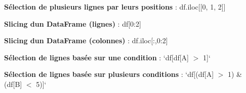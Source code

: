 {\bfseries Sélection de plusieurs lignes par leurs positions} \+: {\ttfamily df.\+iloc\mbox{[}\mbox{[}0, 1, 2\mbox{]}\mbox{]}}

{\bfseries Slicing d\textquotesingle{}un Data\+Frame (lignes)} \+: {\ttfamily df\mbox{[}0\+:2\mbox{]}}

{\bfseries Slicing d\textquotesingle{}un Data\+Frame (colonnes)} \+: {\ttfamily df.\+iloc\mbox{[}\+:,0\+:2\mbox{]}}

{\bfseries Sélection de lignes basée sur une condition} \+: `df\mbox{[}df\mbox{[}\textquotesingle{}A\textquotesingle{}\mbox{]} $>$ 1\mbox{]}`

{\bfseries Sélection de lignes basée sur plusieurs conditions} \+: `df\mbox{[}(df\mbox{[}\textquotesingle{}A\textquotesingle{}\mbox{]} $>$ 1) \& (df\mbox{[}\textquotesingle{}B\textquotesingle{}\mbox{]} $<$ 5)\mbox{]}` 